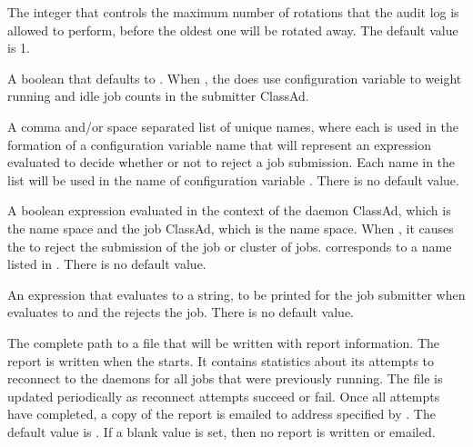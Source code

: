 \begin{description}
\label{param:MaxNumScheddAuditLog}
\item[\Macro{MAX\_NUM\_SCHEDD\_AUDIT\_LOG}]
  The integer that controls the maximum number of rotations that
  the  audit log is allowed to perform,
  before the oldest one will be rotated away. The default value is 1. 

\label{param:ScheddUseSlotWeight}
\item[\Macro{SCHEDD\_USE\_SLOT\_WEIGHT}]
  A boolean that defaults to . When , 
  the  does use configuration variable  
  to weight running and idle job counts in the submitter ClassAd.

\label{param:SubmitRequirementNames}
\item[\Macro{SUBMIT\_REQUIREMENT\_NAMES}]
  A comma and/or space separated list of unique names, 
  where each is used in the formation
  of a configuration variable name that will represent an expression
  evaluated to decide whether or not to reject a job submission.
  Each name in the list will be used in the name of
  configuration variable .
  There is no default value.

\label{param:SubmitRequirementName}
\item[\Macro{SUBMIT\_REQUIREMENT\_<Name>}]
  A boolean expression 
  evaluated in the context of the  daemon ClassAd,
  which is the  name space and the job ClassAd, 
  which is the  name space.
  When , it causes the  to reject 
  the submission of the job or cluster of jobs. 
   corresponds to a name listed in 
  .
  There is no default value.

\label{param:SubmitRequirementNameReason}
\item[\Macro{SUBMIT\_REQUIREMENT\_<Name>\_REASON}]
  An expression that evaluates to a string,
  to be printed for the job submitter when 
  evaluates to  and the  rejects the job.
  There is no default value.

\label{param:ScheddRestartReport}
\item[\Macro{SCHEDD\_RESTART\_REPORT}]
  The complete path to a file that will be written with report information.
  The report is written when the  starts.
  It contains statistics
  about its attempts to reconnect to the  daemons for all jobs
  that were previously running.
  The file is updated periodically as reconnect attempts succeed or fail.
  Once all attempts have completed, a copy of the report is emailed to
  address specified by .
  The default value is .
  If a blank value is set, then no report is written or emailed.

\end{description}
